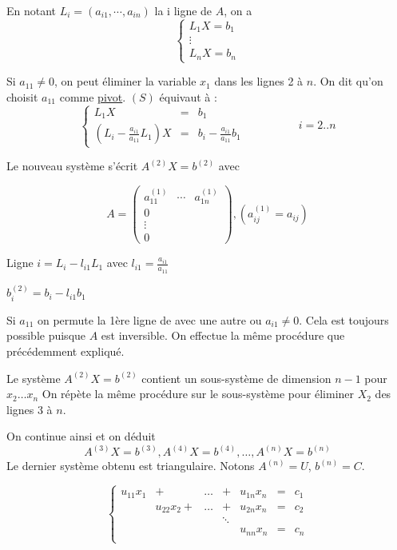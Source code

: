 En notant $L_i = (a_{i1}, \cdots, a_{in})$ la i ligne de $A$, on a
\begin{equation}
    \left\lbrace
    \begin{array}{ccc}
        L_1 X = b_1 \\
        \vdots \\
        L_n X = b_n
    \end{array}\right.
    \tag{S}
    \label{eq:S}
\end{equation}


Si $a_{11} \neq 0$, on peut éliminer la variable $x_1$ dans les lignes 2 à $n$. On dit qu'on choisit $a_{11}$ comme \underline{pivot}.
$(S)$ équivaut à :
\[
    \left\lbrace
    \begin{array}{ccc}
        L_{1}X & = & b_1 \\
        (L_i - \frac{a_{i1}}{a_{11}}L_1) X & = & b_i - \frac{a_{i1}}{a_{11}}b_1 
    \end{array}\right.
    \hspace{2cm} i = 2..n
\]

Le nouveau système s'écrit $A^{(2)}X =b^{(2)}$ avec

\[
    A = 
    \begin{pmatrix}
        a_{11}^{(1)} & \cdots & a_{1n}^{(1)} \\
        0 \\
        \vdots \\
        0
    \end{pmatrix} 
    ,
    (a_{ij}^{(1)} = a_{ij})
\]

Ligne $i = L_i - l_{i1}L_1$ avec $l_{i1} = \frac{a_{i1}}{a_{11}}$

$b_i^{(2)} =  b_i - l_{i1}b_1$

Si $a_{11}$ on permute la 1ère ligne de  avec une autre ou $a_{i1} \neq 0$. Cela est toujours possible puisque $A$ est inversible.
On effectue la même procédure que précédemment expliqué.

Le système $A^{(2)} X = b^{(2)}$ contient un sous-système de dimension $n-1$ pour $x_2\dots x_n$
On répète la même procédure sur le sous-système pour éliminer $X_2$ des lignes 3 à $n$.

On continue ainsi et on déduit
\[
    A^{(3)}X = b^{(3)}, A^{(4)}X = b^{(4)}, \dots, A^{(n)}X=b^{(n)}
\]
Le dernier système obtenu est triangulaire. Notons $A^{(n)}=U$, $b^{(n)}=C$.

\begin{equation}
    \left\lbrace
    \begin{array}{ccccccc}
        u_{11}x_1 & + & \dots & + & u_{1n}x_n & = & c_1 \\
                  & u_{22}x_2 + & \dots & + & u_{2n}x_n & = & c_2 \\
        & & & \ddots \\
        & & & & u_{nn}x_n & = & c_n \\
    \end{array}\right.
    \tag{S'}
    \label{eq:S2}
\end{equation}

